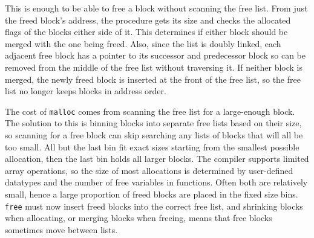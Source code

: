 This is enough to be able to free a block without scanning the free list. From just the freed block's address, the procedure gets its size and checks the allocated flags of the blocks either side of it. %
This determines if either block should be merged with the one being freed. Also, since the list is doubly linked, each adjacent free block has a pointer to its successor and predecessor block so can be removed from the middle of the free list without traversing it. If neither block is merged, the newly freed block is inserted at the front of the free list, so the free list no longer keeps blocks in address order.

The cost of \verb|malloc| comes from scanning the free list for a large-enough block. The solution to this is binning blocks into separate free lists based on their size, so scanning for a free block can skip searching any lists of blocks that will all be too small. All but the last bin fit exact sizes starting from the smallest possible allocation, then the last bin holds all larger blocks. 
The compiler supports limited array operations, so the size of most allocations is determined by user-defined datatypes and the number of free variables in functions. 
Often both are relatively small, hence a large proportion of freed blocks are placed in the fixed size bins.  
\verb|free| must now insert freed blocks into the correct free list, and shrinking blocks when allocating, or merging blocks when freeing, means that free blocks sometimes move between lists.


